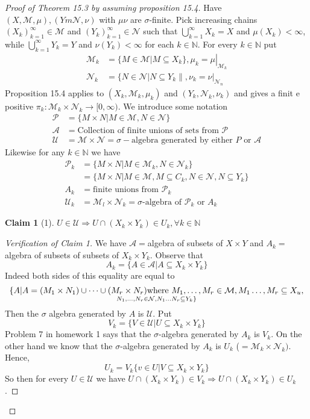 \documentclass[letterpaper, 12pt]{article}
\newcommand{\cU}{\mathcal{U}}
\newcommand{\cM}{\mathcal{M}}
\newcommand{\cN}{\mathcal{N}}
\newcommand{\bN}{\mathbb{N}}
\newcommand{\cP}{\mathcal{P}}
\newcommand{\sA}{\mathcal{A}}
\theoremstyle{stdthm}
\theoremstyle{stddef}
\theoremstyle{stdnonum}
\newtheorem{claim}{Claim}
\theoremstyle{stdqands}
\theoremstyle{stdbold}
\begin{document}
\begin{proof} [ Proof of Theorem 15.3 by assuming proposition 15.4]
Have $(X,\cM, \mu), (Ym\cN,\nu)$ with $\mu\nu$ are $\sigma$-finite. Pick increasing chains $(X_k)_{k=1}^\infty \in \cM$ and $(Y_k)_{k=1}^\infty \in \cN$ such that $\bigcup_{k=1}^\infty X_k = X$ and $\mu(X_k) < \infty$, while $\bigcup_{k=1}^\infty Y_k = Y$ and $\nu(Y_k) < \infty$ for each $k \in \bN$. For every $k \in \bN$ put 
\begin{align*}
\cM_k &= \{ M \in \cM | M \subseteq X_k\}, \left. \mu_k  = \mu \right|_{\cM_k}\\
\cN_k &= \{ N \in \cN | N \subseteq Y_k \|, \left. \nu_k = \nu \right|_{\cN_n}
\end{align*}
Proposition 15.4 applies to $(X_k, \cM_k, \mu_k)$ and $(Y_k, \cN_k, \nu_k)$ and gives a finit e positive  $\pi_k: \cM_k \times \cN_k \to [0,\infty)$. We introduce some notation
\begin{align*}
\cP &= \{ M \times N| M \in \cM, N \in \cN \}\\
\sA &= \mbox{Collection of finite unions of sets from } \cP\\
\cU &= \cM \times \cN = \sigma-\mbox{algebra generated by either $P$ or $\sA$}
\end{align*}
Likewise for any $k \in \bN$ we have 
\begin{align*}
\cP_k &= \{M \times N | M \in \cM_k, N \in \cN_k\}\\
&= \{M \times N| M \in \cM, M \subseteq C_k, N \in \cN, N \subseteq Y_k \}\\
A_k &= \mbox{finite unions from $\cP_k$}\\
\cU_k &= \cM_l \times \cN_k = \mbox{$\sigma$-algebra of $\cP_k$ or $A_k$} 
\end{align*}


\begin{claim}[1]
$U \in \cU \Rightarrow U \cap (X_k \times Y_k) \in U_k, \forall k \in \bN$
\end{claim}
\begin{proof} [Verification of Claim 1]
We have $\sA = $algebra of subsets of $X \times Y$ and $A_k = $ algebra of subsets of subsets of $X_k\times Y_k$. Observe that
\[ A_k = \{A \in \sA| A \subseteq X_k \times Y_k \} \]
Indeed both sides of this equality are equal to 
\[ \{A | A = (M_1 \times N_1) \cup \dots \cup (M_r \times N_r) \mbox{where } M_1,\dots, M_r \in \cM, M_1\dots, M_r \subseteq X_u, \atop N_1,\dots, N_r \in \cN, N_1 \dots N_r \subseteq Y_k \} \] 
Then the $\sigma$ algebra generated by $A$ is $\cU$. Put 
\[ V_k = \{V \in \cU| U \subseteq X_k \times Y_k \} \]
Problem 7 in homework 1 says that the $\sigma$-algebra generated by $A_k$ is $V_k$. On the other hand we know that the $\sigma$-algebra generated by $A_k$ is $U_k$ ($= \cM_k \times \cN_k)$. Hence, 
\[ U_k = V_k \{ v \in U| V \subseteq X_k \times Y_k \} \]
So then for every $U \in \cU$ we have $U \cap (X_k \times Y_k) \in V_k \Rightarrow U \cap (X_k \times Y_k) \in U_k$. 
\end{proof}


\end{proof}
\end{document}
